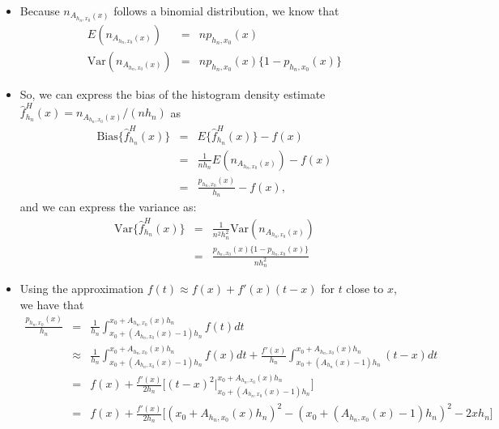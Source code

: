\documentclass[]{book}
\begin{document}
\begin{itemize}
\item
  Because \(n_{A_{h_{n}, x_{0}}(x)}\) follows a binomial distribution, we know that
  \begin{eqnarray}
  E( n_{A_{h_{n}, x_{0}}(x)} ) &=& np_{h_{n}, x_{0}}(x)  \nonumber \\ 
  \textrm{Var}( n_{A_{h_{n}, x_{0}}(x)} ) &=& np_{h_{n}, x_{0}}(x)\{1 - p_{h_{n},x_{0}}(x) \} \nonumber
  \end{eqnarray}
\item
  So, we can express the bias of the histogram density
  estimate \(\hat{f}_{h_{n}}^{H}(x) = n_{A_{h_{n}, x_{0}}(x)}/(nh_{n})\) as
  \begin{eqnarray}
  \textrm{Bias}\{ \hat{f}_{h_{n}}^{H}(x) \} &=& E\{ \hat{f}_{h_{n}}^{H}(x) \} - f(x) \nonumber \\
  &=& \frac{1}{nh_{n}}E( n_{A_{h_{n}, x_{0}}(x)} ) - f(x) \nonumber \\
  &=& \frac{ p_{h_{n}, x_{0}}(x) }{ h_{n} } - f(x), \nonumber
  \end{eqnarray}
  and we can express the variance as:
  \begin{eqnarray}
  \textrm{Var}\{ \hat{f}_{h_{n}}^{H}(x) \}
  &=& \frac{1}{n^{2}h_{n}^{2}}\textrm{Var}( n_{A_{h_{n}, x_{0}}(x)} )  \nonumber \\
  &=& \frac{ p_{h_{n}, x_{0}}(x)\{1 - p_{h_{n}, x_{0}}(x) \} }{ nh_{n}^{2} } \nonumber
  \end{eqnarray}
\item
  Using the approximation \(f(t) \approx f(x) + f'(x)(t - x)\) for \(t\) close to \(x\), we have that
  \begin{eqnarray}
  \frac{ p_{h_{n}, x_{0}}(x) }{ h_{n} } &=& \frac{1}{h_{n}}\int_{x_{0} + (A_{h_{n}, x_{0}}(x) - 1)h_{n}}^{x_{0} + A_{h_{n}, x_{0}}(x)h_{n} } f(t) dt \nonumber \\
   &\approx& \frac{1}{h_{n}}\int_{x_{0} + (A_{h_{n}, x_{0}}(x) - 1)h_{n}}^{x_{0} + A_{h_{n}, x_{0}}(x)h_{n} } f(x) dt + \frac{f'(x)}{h_{n}}\int_{x_{0} + (A_{h_{n}}(x) - 1)h_{n}}^{x_{0} + A_{h_{n}, x_{0}}(x)h_{n} } (t - x) dt \nonumber \\
  &=& f(x) + \frac{f'(x)}{2h_{n}}\Big[ (t - x)^{2}\Big|_{x_{0} + (A_{h_{n}, x_{0}}(x) - 1)h_{n}}^{x_{0} + A_{h_{n}, x_{0}}(x)h_{n} } \Big] \nonumber \\
  &=& f(x) + \frac{f'(x)}{2h_{n}}\Big[ (x_{0} + A_{h_{n}, x_{0}}(x)h_{n})^{2} - (x_{0} + (A_{h_{n}, x_{0}}(x)-1)h_{n} )^{2} - 2xh_{n} \Big] \nonumber \\

\end{eqnarray}
\end{itemize}
\end{document}
